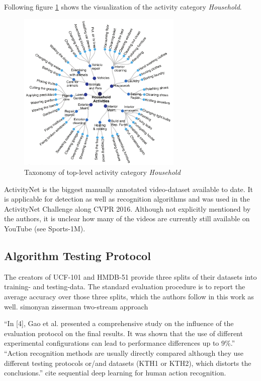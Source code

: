 Following figure \ref{fig:activitynet_taxonomy} shows the visualization of the activity category \textit{Household}.
\begin{figure}[H]
    \centering
    \includegraphics[width=0.7\textwidth]{img_datasets/activitynet_taxonomy}
    \caption{Taxonomy of top-level activity category \textit{Household}}
    \label{fig:activitynet_taxonomy}
\end{figure}

ActivityNet is the biggest manually annotated video-dataset available to date.
It is applicable for detection as well as recognition algorithms and was used in the ActivityNet Challenge along CVPR 2016.
Although not explicitly mentioned by the authors, it is unclear how many of the videos are currently still available on YouTube (see Sports-1M).

\subsection{Algorithm Testing Protocol}

The creators of UCF-101 and HMDB-51 provide three splits of their datasets into training- and testing-data.
The standard evaluation procedure is to report the average accuracy over those three splits, which the authors follow in this work as well.
simonyan zisserman two-stream approach

``In [4], Gao et al. presented a comprehensive study on the influence of the evaluation protocol on the final results. It was shown that the use of different experimental configurations can lead to performance differences up to 9\%.''
``Action recognition methods are usually directly compared although they use different testing protocols or/and datasets (KTH1 or KTH2), which distorts the conclusions.''
cite sequential deep learning for human action recognition.
